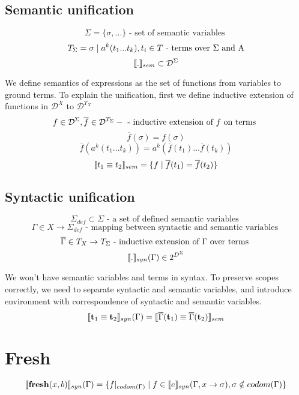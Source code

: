 \documentclass[fleqn]{article}
\begin{document}
\subsection{Semantic unification}

\[ \Sigma = \{ \sigma, ... \}\textrm{ - set of semantic variables }\]
\[ T_\Sigma = \sigma \mid a^k(t_1...t_k), t_i \in T \textrm{ - terms over \( \Sigma \) and A} \]
\[ \llbracket.\rrbracket_{sem} \subset \mathcal{D}^\Sigma \]

We define semantics of expressions as the set of functions from variables to ground terms.
To explain the unification, first we define inductive extension of functions in \(\mathcal{D}^X\) to \(\mathcal{D}^{T_X}\)
\[ f \in \mathcal{D}^\Sigma, \overline{f} \in \mathcal{D}^{T_\Sigma} - \textrm{ - inductive extension of \( f \) on terms } \]
\[ \overline{f}(\sigma) = f(\sigma) \]
\[ \overline{f}(a^k(t_1...t_k)) = a^k(\overline{f}(t_1)...\overline{f}(t_k)) \]
\[ \llbracket t_1 \equiv t_2 \rrbracket_{sem} = \{ f \mid \overline{f}(t_1) = \overline{f}(t_2)  \} \]

\subsection{Syntactic unification}
\[ \Sigma_{def} \subset \Sigma \textrm{ - a set of defined semantic variables } \]
\[ \Gamma \in X \rightarrow \Sigma_{def} \textrm{ - mapping between syntactic and semantic variables }\]
\[ \overline{\Gamma} \in T_X \rightarrow T_{\Sigma} \textrm{ - inductive extension of \( \Gamma \) over terms } \]
\[ \llbracket.\rrbracket_{syn}(\Gamma) \in 2^{D^\Sigma} \]

We won't have semantic variables and terms in syntax. To preserve scopes correctly, we need to separate syntactic and semantic variables, and introduce environment with correspondence of syntactic and semantic variables.
\[ \llbracket\mathbf{t}_1 \equiv \mathbf{t}_2\rrbracket_{syn}(\Gamma) = \llbracket \overline{\Gamma}(\mathbf{t}_1) \equiv \overline{\Gamma}(\mathbf{t}_2) \rrbracket_{sem} \]

\newpage
\section{Fresh}
\[ \llbracket\textrm{\textbf{fresh}}(x, b)\rrbracket_{syn}(\Gamma) = \{ f|_{codom(\Gamma)} \mid f \in \llbracket e\rrbracket_{syn}(\Gamma, x \rightarrow \sigma), \sigma \notin codom(\Gamma) \}\]
\end{document}
